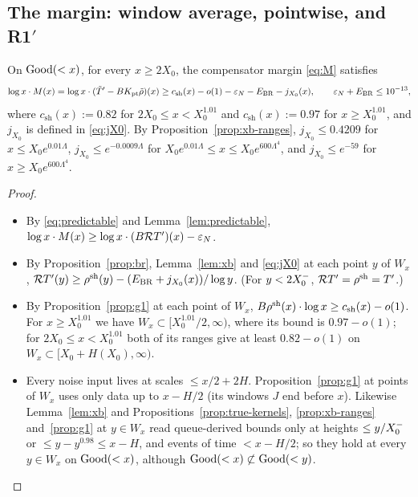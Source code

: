 \subsection{The margin: window average, pointwise, and R1\texorpdfstring{$'$}{'}}\label{sec:noise-margin}

\begin{theorem}\label{thm:g2}
On $\mathrm{Good}(<x)$, for every $x\ge2X_0$, the compensator margin \eqref{eq:M} satisfies
\[
  \log x\cdot M(x)=\log x\cdot(\tilde T'-BK_{\mathrm{pt}}\tilde\rho)(x)\ge c_{\mathrm{sh}}(x)-o(1)-\varepsilon_N-E_{\mathrm{BR}}-j_{X_0}(x),\qquad
  \varepsilon_N+E_{\mathrm{BR}}\le10^{-13},
\]
where $c_{\mathrm{sh}}(x):=0.82$ for $2X_0\le x<X_0^{1.01}$ and $c_{\mathrm{sh}}(x):=0.97$ for $x\ge X_0^{1.01}$, and
$j_{X_0}$ is defined in \eqref{eq:jX0}. By Proposition~\ref{prop:xb-ranges}, $j_{X_0}\le0.4209$ for
$x\le X_0e^{0.01\Lambda}$, $j_{X_0}\le e^{-0.0009\Lambda}$ for $X_0e^{0.01\Lambda}\le x\le X_0e^{600\Lambda^4}$, and
$j_{X_0}\le e^{-59}$ for $x\ge X_0e^{600\Lambda^4}$.
\end{theorem}

\begin{proof}
\begin{itemize}
\item By \eqref{eq:predictable} and Lemma~\ref{lem:predictable}, $\log x\cdot M(x)\ge\log x\cdot(B\mathcal{R} T')(x)-\varepsilon_N$.
\item By Proposition~\ref{prop:br}, Lemma~\ref{lem:xb} and \eqref{eq:jX0} at each point $y$ of $W_x$,
  $\mathcal{R} T'(y)\ge\rho^{\mathrm{sh}}(y)-(E_{\mathrm{BR}}+j_{X_0}(x))/\log y$. (For $y<2X_0^{-}$, $\mathcal{R} T'=\rho^{\mathrm{sh}}=T'$.)
\item By Proposition~\ref{prop:g1} at each point of $W_x$, $B\rho^{\mathrm{sh}}(x)\cdot\log x\ge c_{\mathrm{sh}}(x)-o(1)$. For
  $x\ge X_0^{1.01}$ we have $W_x\subset[X_0^{1.01}/2,\infty)$, where its bound is $0.97-o(1)$; for $2X_0\le x<X_0^{1.01}$ both of
  its ranges give at least $0.82-o(1)$ on $W_x\subset[X_0+H(X_0),\infty)$.
\item Every noise input lives at scales $\le x/2+2H$. Proposition~\ref{prop:g1} at points of $W_x$ uses only data up to
  $x-H/2$ (its windows $J$ end before $x$). Likewise Lemma~\ref{lem:xb} and Propositions~\ref{prop:true-kernels},
  \ref{prop:xb-ranges} and~\ref{prop:g1} at $y\in W_x$ read queue-derived bounds only at heights $\le y/X_0^{-}$ or
  $\le y-y^{0.98}\le x-H$, and events of time $<x-H/2$; so they hold at every $y\in W_x$ on $\mathrm{Good}(<x)$, although
  $\mathrm{Good}(<x)\not\subset\mathrm{Good}(<y)$.\qedhere
\end{itemize}
\end{proof}

